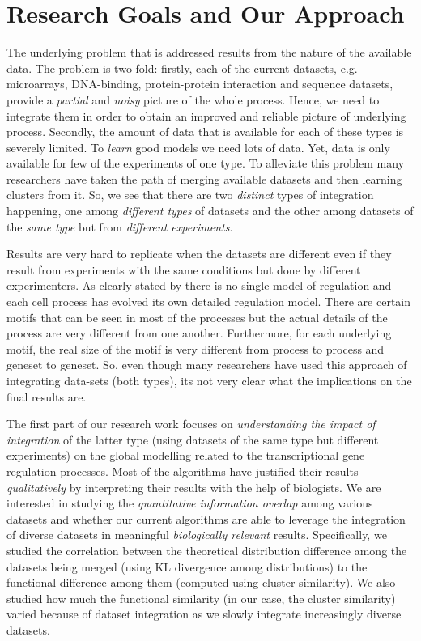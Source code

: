 \section{Research Goals and Our Approach}
The underlying problem that is addressed results from the nature of the available data. The problem is two fold: firstly, each of the current datasets, e.g. microarrays, DNA-binding, protein-protein interaction and sequence datasets, provide a \textit{partial} and \textit{noisy} picture of the whole process. Hence, we need to integrate them in order to obtain an improved and reliable picture of underlying process. Secondly, the amount of data that is available for each of these types is severely limited. To \textit{learn} good models we need lots of data. Yet, data is only available for few of the experiments of one type. To alleviate this problem many researchers have taken the path of merging available datasets and then learning clusters from it. So, we see that there are two \textit{distinct} types of integration happening, one among \textit{different types} of datasets and the other among datasets of the \textit{same type} but from \textit{different experiments}.

Results are very hard to replicate when the datasets are different even if they result from experiments with the same conditions but done by different experimenters. As clearly stated by \citet{orph02thehuman} there is no single model of regulation and each cell process has evolved its own detailed regulation model. There are certain motifs that can be seen in most of the processes but the actual details of the process are very different from one another. Furthermore, for each underlying motif, the real size of the motif is very different from process to process and geneset to geneset. So, even though many researchers have used this approach of integrating data-sets (both types), its not very clear what the implications on the final results are.

The first part of our research work focuses on \textit{understanding the impact of integration} of the latter type (using datasets of the same type but different experiments) on the global modelling related to the transcriptional gene regulation processes. Most of the algorithms have justified their results \textit{qualitatively} by interpreting their results with the help of biologists. We are interested in studying the \textit{quantitative information overlap} among various datasets and whether our current algorithms are able to leverage the integration of diverse datasets in meaningful \textit{biologically relevant} results. Specifically, we studied the correlation between the theoretical distribution difference among the datasets being merged (using \ac{KL} divergence among distributions) to the functional difference among them (computed using cluster similarity). We also studied how much the functional similarity (in our case, the cluster similarity) varied because of dataset integration as we slowly integrate increasingly diverse datasets. 

